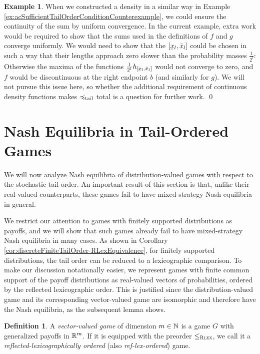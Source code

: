 \documentclass[a4paper,DIV=11]{scrreprt}
\theoremstyle{definition}
\newtheorem{defn}[thm]{Definition} %
\newtheorem{ex}[thm]{Example} %
\begin{document}
\begin{ex}
        When we constructed a density in a similar way in Example \ref{ex:acSufficientTailOrderConditionCounterexample},
        we could ensure the continuity of the sum by uniform convergence.
        In the current example, extra work would be required  to show that the sums used in the definitions of $f$ and $g$ converge uniformly.
        We would need to show that the $[\ubar{x}_l, \bar{x}_l]$ could be chosen in such a way that their lengths approach zero slower than the probability masses $\frac{1}{2^l}$: Otherwise the maxima of the functions $\frac{1}{2^l} h_{[\ubar{x}_l, \bar{x}_l]}$ would not converge to zero, and $f$ would be discontinuous at the right endpoint $b$ (and similarly for $g$).
        We will not pursue this issue here, so whether the additional requirement of continuous density functions makes $\preccurlyeq_{\text{tail}}$ total is a question for further work.
        \qed
    \end{ex}


    \section{Nash Equilibria in Tail-Ordered Games}
    \label{sec:equilibriaInTailOrderedGames}
    We will now analyze Nash equilibria of distribution-valued games with respect to the stochastic tail order.
    An important result of this section is that, unlike their real-valued counterparts, these games fail to have mixed-strategy Nash equilibria in general.
    
    We restrict our attention to games with finitely supported distributions as payoffs, and we will show that such games already fail to have mixed-strategy Nash equilibria in many cases.
    As shown in Corollary \ref{cor:discreteFiniteTailOrder-RLexEquivalence}, for finitely supported distributions, the tail order can be reduced to a lexicographic comparison.
    To make our discussion notationally easier, we represent games with finite common support of the payoff distributions as real-valued vectors of probabilities, ordered by the reflected lexicographic order. This is justified since the distribution-valued game and its corresponding vector-valued game are isomorphic and therefore have the Nash equilibria, as the subsequent lemma shows.
    \begin{defn}
        A \emph{vector-valued game} of dimension $m \in \mathbb{N}$ is a game $G$ with generalized payoffs in $\mathbb{R}^m$.
        If it is equipped with the preorder $\leq_{\textsc{Rlex}}$, we call it a \emph{reflected-lexicographically ordered} (also \emph{ref-lex-ordered}) game.
        \label{def:vectorValuedGame}
    \end{defn}
\end{document}
